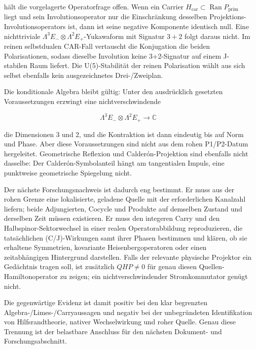  hält die vorgelagerte Operatorfrage offen. Wenn
ein Carrier \(H_\mathrm{car}\subset\operatorname{Ran}P_\mathrm{prim}\) liegt und
sein Involutionsoperator nur die Einschränkung desselben Projektions-
Involutionsoperators ist, dann ist seine negative Komponente identisch null.
Eine nichttriviale \(\Lambda^3E_-\otimes\Lambda^2E_+\)-Yukawaform mit
Signatur $3+2$ folgt daraus nicht. Im reinen selbstdualen CAR-Fall vertauscht
die Konjugation die beiden Polarisationen, sodass dieselbe Involution keine
3+2-Signatur auf einem J-stabilen Raum liefert. Die U(5)-Stabilität der
reinen Polarisation wählt aus sich selbst ebenfalls kein ausgezeichnetes
Drei-/Zweiplan.

Die konditionale Algebra bleibt gültig: Unter den ausdrücklich gesetzten
Voraussetzungen erzwingt eine nichtverschwindende

\[
 \Lambda^3E_-\otimes\Lambda^2E_+\to\mathbb C
\]

die Dimensionen $3$ und $2$, und die Kontraktion ist dann eindeutig bis
auf Norm und Phase. Aber diese Voraussetzungen sind nicht aus dem rohen
P1/P2-Datum hergeleitet. Geometrische Reflexion und Calderón-Projektion sind
ebenfalls nicht dasselbe: Der Calderón-Symbolanteil hängt am tangentialen
Impuls, eine punktweise geometrische Spiegelung nicht.

Der nächste Forschungsnachweis ist dadurch eng bestimmt. Er muss aus der
rohen Grenze eine lokalisierte, geladene Quelle mit der erforderlichen
Kanalzahl liefern; beide Adjungierten, Cocycle und Produkte auf demselben
Zustand und derselben Zeit müssen existieren. Er muss den integeren Carry und
den Halbspinor-Sektorwechsel in einer realen Operatorabbildung reproduzieren,
die tatsächlichen (C/J)-Wirkungen samt ihrer Phasen bestimmen und klären,
ob sie erhaltene Symmetrien, kovariante Heisenbergoperatoren oder einen
zeitabhängigen Hintergrund darstellen. Falls der relevante physische
Projektor ein Gedächtnis tragen soll, ist zusätzlich \(QHP\ne0\) für genau
diesen Quellen-Hamiltonoperator zu zeigen; ein nichtverschwindender
Stromkommutator genügt nicht.

Die gegenwärtige Evidenz ist damit positiv bei den klar begrenzten
Algebra-/Limes-/Carryaussagen und negativ bei der unbegründeten Identifikation
von Hilfsrandtheorie, nativer Wechselwirkung und roher Quelle. Genau diese
Trennung ist der belastbare Anschluss für den nächsten Dokument- und
Forschungsabschnitt.

